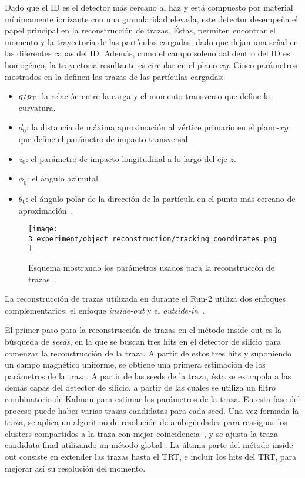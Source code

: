 Dado que el \ac{ID} es el detector más cercano al haz y está compuesto por material mínimamente ionizante con una granularidad elevada, este detector desempeña el papel principal en la reconstrucción de trazas. \'Estas, permiten encontrar el momento y la trayectoria de las partículas cargadas, dado que dejan una se\~nal en las diferentes capas del \ac{ID}. Adem\'as, como el campo solenoidal dentro del \ac{ID} es homogéneo, la trayectoria resultante es circular en el plano \(xy\). Cinco parámetros mostrados en la \Fig{\ref{fig:objects:track_vtx:track_parameters}} definen las trazas de las partículas cargadas:
\begin{itemize}
    \item \(q/p_{\text{T}}\): la relación entre la carga y el momento transverso que define la curvatura.
    \item \(d_0\): la distancia de máxima aproximación al vértice primario en el plano-\(xy\) que define el parámetro de impacto transversal.
    \item \(z_0\): el parámetro de impacto longitudinal a lo largo del eje \(z\).
    \item \(\phi_0\): el ángulo azimutal.
    \item \(\theta_0\): el ángulo polar de la dirección de la partícula en el punto más cercano de aproximación~\cite{ATLAS-Tracks-Performance-Run2}.
\end{itemize}

\begin{figure}[ht!]
    \centering
    \texttt{[image: 3\_experiment/object\_reconstruction/tracking\_coordinates.png]}
    \caption{Esquema mostrando los par\'ametros usados para la reconstrucc\'on de trazas~\cite{ATLAS-Tracking-2007}.}
    \label{fig:objects:track_vtx:track_parameters}
\end{figure}

La reconstrucción de trazas utilizada en durante el Run-2 utiliza dos enfoques complementarios: el enfoque \textit{inside-out} y el \textit{outside-in}~\cite{ATLAS-NEWT}.

El primer paso para la reconstrucción de trazas en el m\'etodo inside-out es la búsqueda de \textit{seeds}, en la que se buscan tres hits en el detector de silicio para comenzar la reconstrucción de la traza. A partir de estos tres hits y suponiendo un campo magnético uniforme, se obtiene una primera estimación de los parámetros de la traza. A partir de las seeds de la traza, ésta se extrapola a las demás capas del detector de silicio, a partir de las cuales se utiliza un filtro combinatorio de Kalman para estimar los parámetros de la traza. En esta fase del proceso puede haber varias trazas candidatas para cada seed. Una vez formada la traza, se aplica un algoritmo de resolución de ambigüedades para reasignar los clusters compartidos a la traza con mejor coincidencia~\cite{ATLAS-NNClustering}, y se ajusta la traza candidata final utilizando un método global \chisq. La última parte del método inside-out consiste en extender las trazas hasta el \ac{TRT}, e incluir los hits del \ac{TRT}, para mejorar as\'i su resolución del momento.

